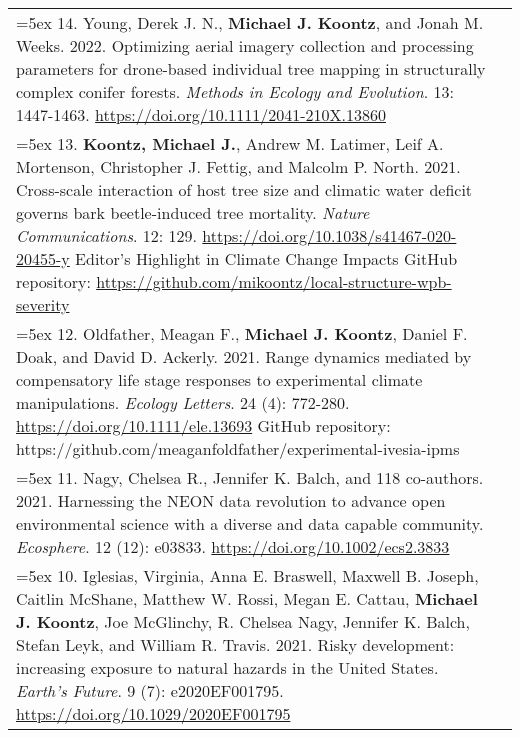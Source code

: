 \begin{longtable}{@{} >{\raggedright}p{6.10in} >{\raggedleft}X @{}}
\hangindent=5ex 14. Young, Derek J. N., \textbf{Michael J. Koontz}, and Jonah M. Weeks. 2022. Optimizing aerial imagery collection and processing parameters for drone-based individual tree mapping in structurally complex conifer forests. \emph{Methods in Ecology and Evolution}. 13: 1447-1463. \href{https://doi.org/10.1111/2041-210X.13860}{https://doi.org/10.1111/2041-210X.13860} & \tabularnewline

\hangindent=5ex 13. \textbf{Koontz, Michael J.}, Andrew M. Latimer, Leif A. Mortenson, Christopher J. Fettig, and Malcolm P. North. 2021. Cross-scale interaction of host tree size and climatic water deficit governs bark beetle-induced tree mortality. \emph{Nature Communications}. 12: 129. \href{https://doi.org/10.1038/s41467-020-20455-y}{https://doi.org/10.1038/s41467-020-20455-y}
\newline *Editor's Highlight in Climate Change Impacts %
\newline GitHub repository: \href{https://github.com/mikoontz/local-structure-wpb-severity}{https://github.com/mikoontz/local-structure-wpb-severity} & \tabularnewline

\hangindent=5ex 12. Oldfather, Meagan F., \textbf{Michael J. Koontz}, Daniel F. Doak, and David D. Ackerly. 2021. Range dynamics mediated by compensatory life stage responses to experimental climate manipulations. \emph{Ecology Letters}. 24 (4): 772-280. \href{https://doi.org/10.1111/ele.13693}{https://doi.org/10.1111/ele.13693}
\newline GitHub repository: https://github.com/meaganfoldfather/experimental-ivesia-ipms & \tabularnewline

\hangindent=5ex 11. Nagy, Chelsea R., Jennifer K. Balch, and 118 co-authors. 2021. Harnessing the NEON data revolution to advance open environmental science with a diverse and data capable community. \emph{Ecosphere}. 12 (12): e03833. \href{https://doi.org/10.1002/ecs2.3833}{https://doi.org/10.1002/ecs2.3833} & \tabularnewline

\hangindent=5ex 10. Iglesias, Virginia, Anna E. Braswell, Maxwell B. Joseph, Caitlin McShane, Matthew W. Rossi, Megan E. Cattau, \textbf{Michael J. Koontz}, Joe McGlinchy, R. Chelsea Nagy, Jennifer K. Balch, Stefan Leyk, and William R. Travis. 2021. Risky development: increasing exposure to natural hazards in the United States. \emph{Earth's Future}. 9 (7): e2020EF001795. \href{https://doi.org/10.1029/2020EF001795}{https://doi.org/10.1029/2020EF001795} & \tabularnewline


\end{longtable}
